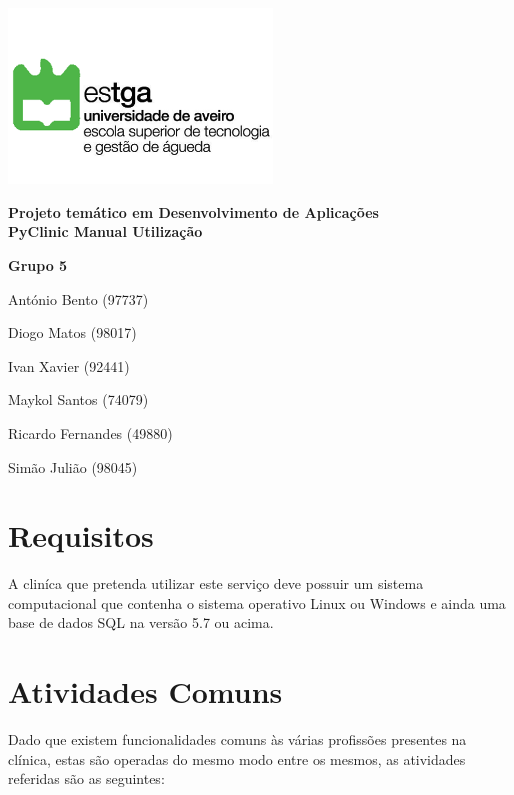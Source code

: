\documentclass[11pt,a4paper,twoside]{article}
\title{}
\author{}
\begin{document}
\begin{titlepage}
	\centering
	\vfill
	\includegraphics[width=7cm]{image/ESTGA} %
	\vfill
	
	{\bfseries\Large
		Projeto temático em Desenvolvimento de Aplicações\\
		PyClinic Manual Utilização \\
		\vskip2cm
	}    
	
	\vfill
	\textbf{Grupo 5}
	
	António Bento (97737)
	
	Diogo Matos (98017)
	
	Ivan Xavier (92441)
	
	Maykol Santos (74079)
	
	Ricardo Fernandes (49880)
	
	Simão Julião (98045)
	\vfill
\end{titlepage}



\begin{small}
	\tableofcontents
\end{small}

\listoffigures
\newpage\null\thispagestyle{empty}\newpage
{}



 

\section{Requisitos}
A cliníca que pretenda utilizar este serviço deve possuir um sistema computacional que contenha o sistema operativo Linux ou Windows e ainda uma base de dados SQL na versão 5.7 ou acima.
\section{Atividades Comuns}

Dado que existem funcionalidades comuns às várias profissões presentes na clínica, estas são operadas do mesmo modo entre os mesmos, as atividades referidas são as seguintes:
\end{document}
